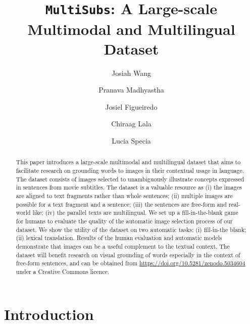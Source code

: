 \documentclass[twocolumn]{svjour3}          \smartqed  \usepackage{graphicx}
\newcommand{\multisubs}{\texttt{MultiSubs}\xspace}
\begin{document}
\title{\multisubs: A Large-scale Multimodal and Multilingual Dataset
}






\author{Josiah Wang \and
        Pranava Madhyastha \and 
        Josiel Figueiredo \and
        Chiraag Lala \and
        Lucia Specia
}




\date{}


\maketitle

\begin{abstract}
This paper introduces a large-scale multimodal and multilingual dataset that aims to facilitate research on grounding words to images in their contextual usage in language. The dataset consists of images selected to unambiguously illustrate concepts expressed in sentences from movie subtitles. The dataset is a valuable resource as (i) the images are aligned to text fragments rather than whole sentences; (ii) multiple images are possible for a text fragment and a sentence; (iii) the sentences are free-form and real-world like; (iv) the parallel texts are multilingual. We set up a fill-in-the-blank game for humans to evaluate the quality of the automatic image selection process of our dataset. We show the utility of the dataset on two automatic tasks: (i) fill-in-the blank; (ii) lexical translation. Results of the human evaluation and automatic models demonstrate that images can be a useful complement to the textual context. The dataset will benefit research on visual grounding of words especially in the context of free-form sentences, and can be obtained from \url{https://doi.org/10.5281/zenodo.5034604} under a Creative Commons licence.\\ 
\end{abstract}

\section{Introduction}
\label{sec:introduction}
\end{document}
